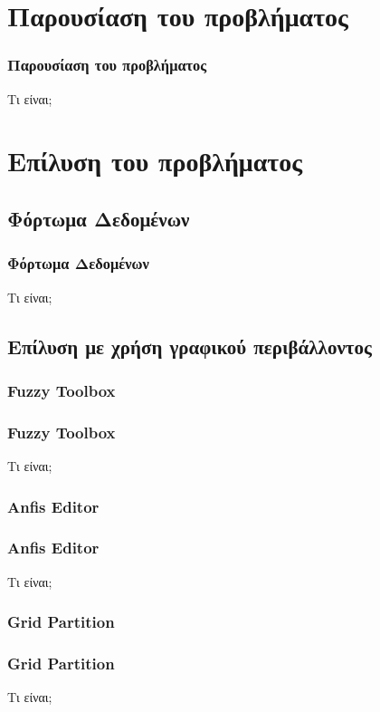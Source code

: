 \documentclass[xetex,serif,mathserif,14pt]{beamer}
\begin{document}

\section{Παρουσίαση του προβλήματος}

\begin{frame}
\frametitle{Παρουσίαση του προβλήματος}
Τι είναι;
\end{frame}


\section{Επίλυση του προβλήματος}

\subsection{Φόρτωμα Δεδομένων}

\begin{frame}
\frametitle{Φόρτωμα Δεδομένων}
Τι είναι;
\end{frame}

\subsection{Επίλυση με χρήση γραφικού περιβάλλοντος}

\subsubsection{Fuzzy Toolbox}
\begin{frame}
\frametitle{Fuzzy Toolbox}
Τι είναι;
\end{frame}

\subsubsection{Anfis Editor}
\begin{frame}
\frametitle{Anfis Editor}
Τι είναι;
\end{frame}

\subsubsection{Grid Partition}
\begin{frame}
\frametitle{Grid Partition}
Τι είναι;
\end{frame}
\end{document}
